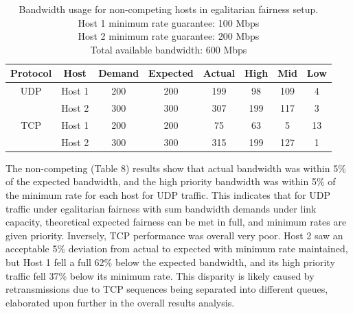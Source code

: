 \documentclass[accepted,single]{gipaper}
\begin{document}
\begin{table}[h]
	\label{egal_nc}
	\vspace{-2mm}
	\begin{center}
		\begin{small}
		\setlength\tabcolsep{1.5pt}
			\begin{tabular}{cccccccc}
				Protocol & Host & Demand & Expected & Actual & High & Mid & Low\\
				\hline
				UDP & Host 1 & 200 & 200 & 199 & 98 & 109 & 4\\
				    & Host 2 & 300 & 300 & 307 & 199 & 117 & 3\\
				\hline
				TCP & Host 1 & 200 & 200 & 75 & 63 & 5 & 13\\
				    & Host 2 & 300 & 300 & 315 & 199 & 127 & 1\\
			\end{tabular}
		\end{small}
	\end{center}
	\caption{Bandwidth usage for non-competing hosts in egalitarian fairness setup.\\
	Host 1 minimum rate guarantee: 100 Mbps\\
	Host 2 minimum rate guarantee: 200 Mbps\\	
	Total available bandwidth: 600 Mbps}
	\vspace{-3mm}
\end{table}

The non-competing (Table 8) results show that actual bandwidth was within 5\% of the expected bandwidth, and the high priority bandwidth was within 5\% of the minimum rate for each host for UDP traffic. This indicates that for UDP traffic under egalitarian fairness with sum bandwidth demands under link capacity, theoretical expected fairness can be met in full, and minimum rates are given priority. Inversely, TCP performance was overall very poor. Host 2 saw an acceptable 5\% deviation from actual to expected with minimum rate maintained, but Host 1 fell a full 62\% below the expected bandwidth, and its high priority traffic fell 37\% below its minimum rate. This disparity is likely caused by retransmissions due to TCP sequences being separated into different queues, elaborated upon further in the overall results analysis.
\end{document}
